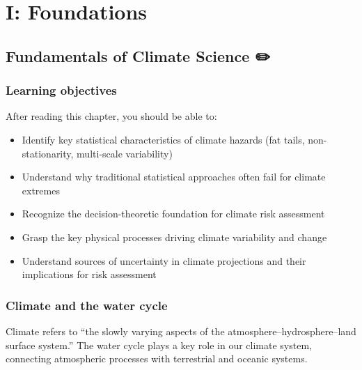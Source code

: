 \documentclass[
  letterpaper,
  DIV=11,
  numbers=noendperiod]{scrreprt}
\providecommand{\tightlist}{%
  \setlength{\itemsep}{0pt}\setlength{\parskip}{0pt}}
\begin{document}
\part{\textbf{I: Foundations}}

\chapter{Fundamentals of Climate Science
✏️}\label{fundamentals-of-climate-science}

\section*{Learning objectives}\label{learning-objectives}


After reading this chapter, you should be able to:

\begin{itemize}
\tightlist
\item
  Identify key statistical characteristics of climate hazards (fat
  tails, non-stationarity, multi-scale variability)
\item
  Understand why traditional statistical approaches often fail for
  climate extremes
\item
  Recognize the decision-theoretic foundation for climate risk
  assessment
\item
  Grasp the key physical processes driving climate variability and
  change
\item
  Understand sources of uncertainty in climate projections and their
  implications for risk assessment
\end{itemize}

\section{Climate and the water cycle}\label{climate-and-the-water-cycle}

Climate refers to ``the slowly varying aspects of the
atmosphere--hydrosphere--land surface system.'' The water cycle plays a
key role in our climate system, connecting atmospheric processes with
terrestrial and oceanic systems.
\end{document}
